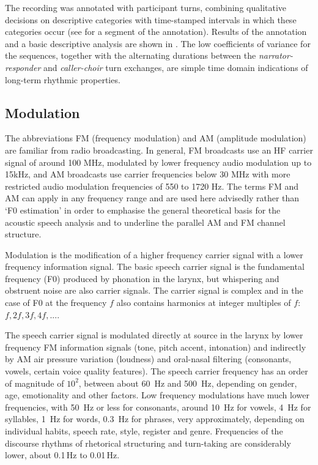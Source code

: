\documentclass[output=paper,colorlinks,citecolor=brown]{langscibook}
\begin{document}
The recording was annotated with participant turns, combining qualitative decisions on descriptive categories with time-stamped intervals in which these categories occur (see  for a segment of the annotation). Results of the annotation and a basic descriptive analysis are shown in . The low coefficients of variance for the sequences, together with the alternating durations between the \textit{narrator-responder} and \textit{caller-choir} turn exchanges, are simple time domain indications of long-term rhythmic properties.

\subsection{Modulation}

The abbreviations FM (frequency modulation) and AM (amplitude modulation) are familiar from radio broadcasting. In general, FM broadcasts use an HF carrier signal of around 100 MHz, modulated by lower frequency audio modulation up to 15kHz, and AM broadcasts use carrier frequencies below 30 MHz with more restricted audio modulation frequencies of 550 to 1720 Hz. The terms FM and AM can apply in any frequency range and are used here advisedly rather than `F0 estimation' in order to emphasise the general theoretical basis for the acoustic speech analysis and to underline the parallel AM and FM channel structure.

Modulation is the modification of a higher frequency carrier signal with a lower frequency information signal. The basic speech carrier signal is the fundamental frequency (F0) produced by phonation in the larynx, but whispering and obstruent noise are also carrier signals. The carrier signal is complex and in the case of F0 at the frequency $f$ also contains harmonics at integer multiples of $f$: $f, 2f, 3f, 4f,  ... $.

The speech carrier signal is modulated directly at source in the larynx by lower frequency FM information signals (tone, pitch accent, intonation) and indirectly by AM air pressure variation (loudness) and oral-nasal filtering (consonants, vowels, certain voice quality features). The speech carrier frequency has an order of magnitude of $10^2$, between about 60~Hz and 500~Hz, depending on gender, age, emotionality and other factors. Low frequency modulations have much lower frequencies, with 50~Hz or less for consonants, around 10~Hz for vowels, 4~Hz for syllables, 1~Hz for words, 0.3~Hz for phrases, very approximately, depending on individual habits, speech rate, style, register and genre. Frequencies of the discourse rhythms of rhetorical structuring and turn-taking are considerably lower, about 0.1\,Hz to 0.01\,Hz.
\end{document}
